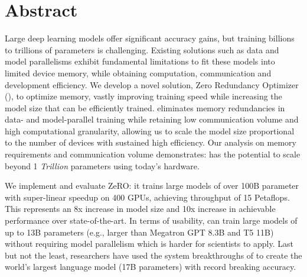 \section*{Abstract}
Large deep learning models offer significant accuracy gains, but training billions to trillions of parameters is challenging. Existing solutions such as data and model parallelisms exhibit fundamental limitations to fit these models into limited device memory, while obtaining computation, communication and development efficiency.
We develop a novel solution, Zero Redundancy Optimizer (\name), to optimize memory, vastly improving training speed while increasing the model size that can be efficiently trained.  
\name eliminates memory redundancies in data- and model-parallel training while retaining low communication volume and high computational granularity, allowing us to scale the model size proportional to the number of devices with sustained high efficiency. Our analysis on memory requirements and communication volume demonstrates: \name has the potential to scale beyond 1 \emph{Trillion} parameters using today's hardware.

We implement and evaluate ZeRO: it trains large models of over 100B parameter with super-linear speedup on 400 GPUs, achieving throughput of 15 Petaflops. This represents an 8x increase in model size and 10x increase in achievable performance over state-of-the-art.  
In terms of usability, 
\name can train large models of up to 13B parameters (e.g., larger than Megatron GPT 8.3B and T5 11B) without requiring model parallelism which is harder for scientists to apply.
Last but not the least, researchers have used the system breakthroughs of \name to create the world's largest language model (17B parameters) with record breaking accuracy.


